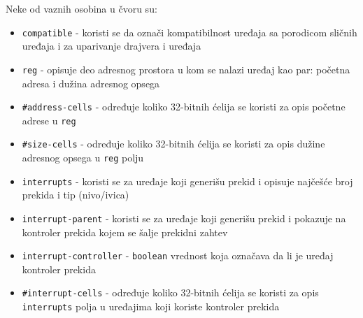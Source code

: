 Neke od vaznih osobina u čvoru su:
\begin{itemize}
\item \texttt{compatible} - koristi se da označi kompatibilnost uređaja sa porodicom sličnih uređaja i za uparivanje drajvera i uređaja
\item \texttt{reg} - opisuje deo adresnog prostora u kom se nalazi uređaj kao par: početna adresa i dužina adresnog opsega
\item \texttt{#address-cells} - određuje koliko 32-bitnih ćelija se koristi za opis početne adrese u \texttt{reg}
\item \texttt{#size-cells} - određuje koliko 32-bitnih ćelija se koristi za opis dužine adresnog opsega u \texttt{reg} polju
\item \texttt{interrupts} - koristi se za uređaje koji generišu prekid i opisuje najčešće broj prekida i tip (nivo/ivica)
\item \texttt{interrupt-parent} - koristi se za uređaje koji generišu prekid i pokazuje na kontroler prekida kojem se šalje prekidni zahtev
\item \texttt{interrupt-controller} - \texttt{boolean} vrednost koja označava da li je uređaj kontroler prekida
\item \texttt{#interrupt-cells} - određuje koliko 32-bitnih ćelija se koristi za opis \texttt{interrupts} polja u uređajima koji koriste kontroler prekida
\end{itemize}

